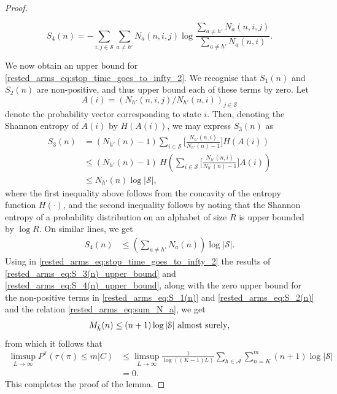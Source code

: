 \begin{proof}
\begin{enumerate}
\begin{equation}
		S_4(n)=-\sum\limits_{i,j\in\mathcal{S}}\sum\limits_{a\neq h'}N_a(n,i,j)\log\frac{\sum\limits_{a\neq h'}N_a(n,i,j)}{\sum\limits_{a\neq h'}N_a(n,i)}.\label{rested_arms_eq:S_4(n)}
		\end{equation}
\end{enumerate}
We now obtain an  upper bound for \eqref{rested_arms_eq:stop_time_goes_to_infty_2}. We recognise that $S_1(n)$ and $S_2(n)$ are non-positive, and thus upper bound each of these terms by zero. Let $$A(i)=(N_{h'}(n,i,j)/N_{h'}(n,i))_{j\in\mathcal{S}}$$ denote the probability vector corresponding to state $i$. Then, denoting the Shannon entropy of $A(i)$ by $H(A(i))$, we may express $S_3(n)$ as
\begingroup\allowdisplaybreaks\begin{align}
	S_3(n)&=(N_{h'}(n)-1)\sum\limits_{i\in\mathcal{S}}\bigg[\frac{N_{h'}(n,i)}{N_{h'}(n)-1}\bigg]H(A(i))\nonumber\\
	&\leq (N_{h'}(n)-1)~H\left(\sum\limits_{i\in\mathcal{S}}\bigg[\frac{N_{h'}(n,i)}{N_{h'}(n)-1}\bigg]A(i)\right)\nonumber\\
	&\leq N_{h'}(n) \log|\mathcal{S}|,\label{rested_arms_eq:S_3(n)_upper_bound}
\end{align}\endgroup
where the first inequality above follows from the concavity of the entropy function $H(\cdot)$, and the second inequality follows by noting that the Shannon entropy of a probability distribution on an alphabet of size $R$ is upper bounded by $\log R$. On similar lines, we get
\begingroup\allowdisplaybreaks\begin{align}
	S_4(n)&\leq \left(\sum\limits_{a\neq h'}N_a(n)\right)\log|\mathcal{S}|.\label{rested_arms_eq:S_4(n)_upper_bound}
\end{align}\endgroup
Using in \eqref{rested_arms_eq:stop_time_goes_to_infty_2} the results of \eqref{rested_arms_eq:S_3(n)_upper_bound} and \eqref{rested_arms_eq:S_4(n)_upper_bound}, along with the zero upper bound for the non-positive terms in \eqref{rested_arms_eq:S_1(n)} and \eqref{rested_arms_eq:S_2(n)} and the relation \eqref{rested_arms_eq:sum_N_a}, we get
\begingroup\allowdisplaybreaks\begin{align}
	M_{\tilde{h}}(n)\leq (n+1)\log |\mathcal{S}|\text{ \text{almost surely}},\label{rested_arms_eq:upper_bound_on_M_h(n)}
\end{align}\endgroup
from which it follows that
\begingroup\allowdisplaybreaks\begin{align}
	\limsup\limits_{L\to\infty}P^\pi(\tau(\pi)\leq m|C)
	&\leq \limsup\limits_{L\to\infty}\frac{1}{\log((K-1)L)}\sum\limits_{\tilde{h}\in\mathcal{A}}\sum\limits_{n=K}^{m}(n+1)\log |\mathcal{S}|\nonumber\\
	&=0.
\end{align}\endgroup
This completes the proof of the lemma.
\end{proof}

